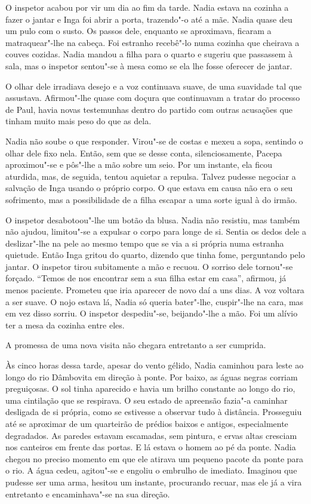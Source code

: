 \bigskip

O inspetor acabou por vir um dia ao fim da tarde. Nadia estava na
cozinha a fazer o jantar e Inga foi abrir a porta, trazendo"-o até a mãe.
Nadia quase deu um pulo com o susto. Os passos dele, enquanto se
aproximava, ficaram a matraquear"-lhe na cabeça. Foi estranho recebê"-lo numa cozinha que cheirava a couves cozidas. Nadia mandou a filha
para o quarto e sugeriu que passassem à sala, mas o inspetor sentou"-se
à mesa como se ela lhe fosse oferecer de jantar.

O olhar dele irradiava desejo e a voz continuava suave, de uma suavidade
tal que assustava. Afirmou"-lhe quase com doçura que continuavam a tratar
do processo de Paul, havia novas testemunhas dentro do partido com
outras acusações que tinham muito mais peso do que as dela.

Nadia não soube o que responder. Virou"-se de costas e mexeu a sopa,
sentindo o olhar dele fixo nela. Então, sem que se desse conta,
silenciosamente, Pacepa aproximou"-se e pôs"-lhe a mão sobre um seio. Por
um instante, ela ficou
aturdida, mas, de seguida, tentou aquietar a repulsa. Talvez pudesse
negociar a salvação de Inga usando o próprio corpo. O que estava em
causa não era o seu sofrimento, mas a possibilidade de a filha escapar a
uma sorte igual à do irmão.

O inspetor desabotoou"-lhe um botão da blusa. Nadia não resistiu, mas
também não ajudou, limitou"-se a expulsar o corpo para longe de si.
Sentia os dedos dele a deslizar"-lhe na pele ao mesmo tempo que se via a si própria numa estranha
quietude. Então Inga gritou do quarto, dizendo que tinha fome,
perguntando pelo jantar. O inspetor tirou subitamente a mão e recuou. O
sorriso dele tornou"-se forçado. ``Temos de nos encontrar sem a sua
filha estar em casa'', afirmou, já menos paciente. Prometeu que iria
aparecer de novo daí a uns dias. A voz voltara a ser suave. O nojo
estava lá, Nadia só queria bater"-lhe, cuspir"-lhe na cara, mas em vez
disso sorriu. O inspetor despediu"-se, beijando"-lhe a mão. Foi um alívio
ter a mesa da cozinha entre eles.

A promessa de uma nova visita não chegara entretanto a ser cumprida.

\bigskip

Às cinco horas dessa tarde, apesar do vento gélido, Nadia caminhou para
leste ao longo do rio Dâmbovita em direção à ponte. Por baixo, as águas
negras corriam preguiçosas. O sol tinha aparecido e havia um brilho
constante ao longo do rio, uma cintilação que se respirava. O seu
estado de apreensão fazia"-a caminhar desligada de si própria, como se
estivesse a observar tudo à distância. Prosseguiu até se aproximar de um
quarteirão de prédios
baixos e antigos, especialmente degradados. As paredes estavam
escamadas, sem pintura, e ervas altas cresciam nos canteiros em frente
das portas. E lá estava o homem ao pé da ponte. Nadia chegou no preciso
momento em que ele atirava um pequeno pacote da ponte para o rio. A água
cedeu, agitou"-se e engoliu o embrulho de imediato. Imaginou que
pudesse ser uma arma, hesitou um instante, procurando recuar, mas ele
já a vira entretanto e encaminhava"-se na sua direção.

